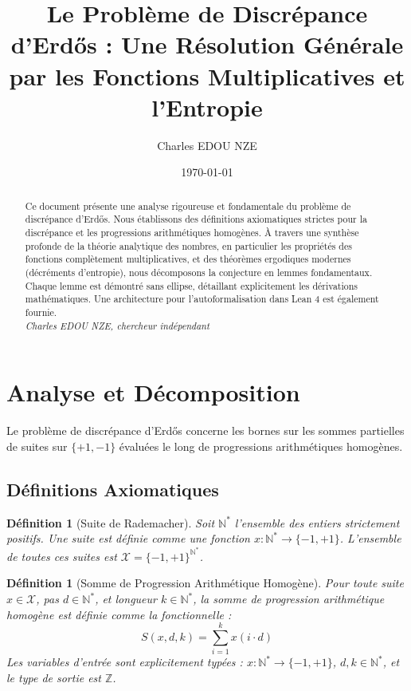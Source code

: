 \documentclass[11pt,a4paper]{article}
\title{Le Probl\`eme de Discr\'epance d'Erd\H{o}s : Une R\'esolution G\'en\'erale par les Fonctions Multiplicatives et l'Entropie}
\author{Charles EDOU NZE}
\date{\today}
\newtheorem{definition}[theorem]{D\'efinition}
\begin{document}
\maketitle

\begin{abstract}
Ce document pr\'esente une analyse rigoureuse et fondamentale du probl\`eme de discr\'epance d'Erd\H{o}s. Nous \'etablissons des d\'efinitions axiomatiques strictes pour la discr\'epance et les progressions arithm\'etiques homog\`enes. \`A travers une synth\`ese profonde de la th\'eorie analytique des nombres, en particulier les propri\'et\'es des fonctions compl\`etement multiplicatives, et des th\'eor\`emes ergodiques modernes (d\'ecr\'ements d'entropie), nous d\'ecomposons la conjecture en lemmes fondamentaux. Chaque lemme est d\'emontr\'e sans ellipse, d\'etaillant explicitement les d\'erivations math\'ematiques. Une architecture pour l'autoformalisation dans Lean 4 est \'egalement fournie.
\vspace{0.5cm}\\
\noindent \textit{Charles EDOU NZE, chercheur ind\'ependant}
\end{abstract}

\tableofcontents
\newpage

\section{Analyse et D\'ecomposition}

Le probl\`eme de discr\'epance d'Erd\H{o}s concerne les bornes sur les sommes partielles de suites sur $\{+1, -1\}$ \'evalu\'ees le long de progressions arithm\'etiques homog\`enes.

\subsection{D\'efinitions Axiomatiques}

\begin{definition}[Suite de Rademacher]
Soit $\mathbb{N}^*$ l'ensemble des entiers strictement positifs. Une suite est d\'efinie comme une fonction $x : \mathbb{N}^* \to \{-1, +1\}$.
L'ensemble de toutes ces suites est $\mathcal{X} = \{-1, +1\}^{\mathbb{N}^*}$.
\end{definition}

\begin{definition}[Somme de Progression Arithm\'etique Homog\`ene]
Pour toute suite $x \in \mathcal{X}$, pas $d \in \mathbb{N}^*$, et longueur $k \in \mathbb{N}^*$, la somme de progression arithm\'etique homog\`ene est d\'efinie comme la fonctionnelle :
$$ S(x, d, k) = \sum_{i=1}^{k} x(i \cdot d) $$
Les variables d'entr\'ee sont explicitement typ\'ees : $x : \mathbb{N}^* \to \{-1, +1\}$, $d, k \in \mathbb{N}^*$, et le type de sortie est $\mathbb{Z}$.
\end{definition}
\end{document}
